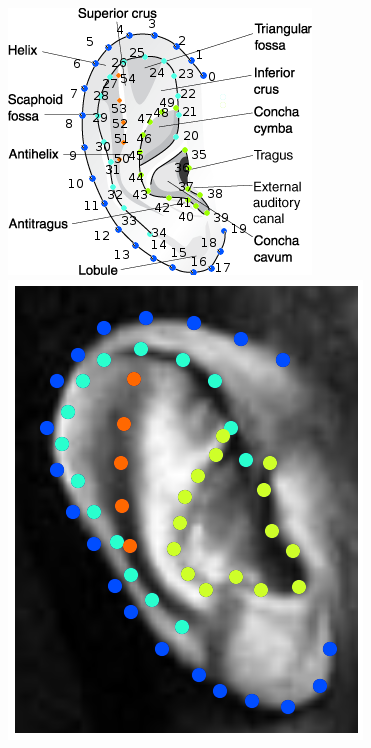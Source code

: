 \begin{figure}
    \centering
    \includegraphics[width=\columnwidth]{resources/Ear_Deformable_Model/pinna} \\
    \newcommand{\flowh}{0.22\columnwidth}
    \newcommand{\flowhhh}{0.21\columnwidth}
    \includegraphics[height=\flowh]{resources/Ear_Deformable_Model/dbs/db_1}
    \hfill

\end{figure}
